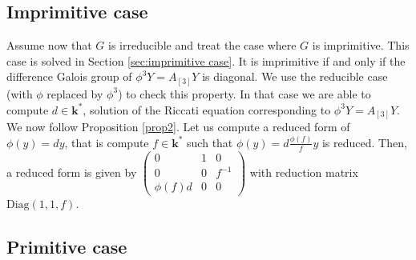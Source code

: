 \documentclass[a4paper,11pt]{amsart}
\def\k{\mathbf{k}}
\begin{document}
\subsection{Imprimitive case}
Assume now that $G$ is irreducible and treat the case where $G$ is imprimitive. This case is  solved in Section \ref{sec:imprimitive case}.
 It is imprimitive if and only if the difference Galois group of $\phi^3 Y=A_{[3]}Y$ is diagonal. We use the reducible case (with $\phi$ replaced by $\phi^3$) to check this property.   In that case we are able to compute $d\in \k^*$,  solution of the Riccati equation corresponding to $\phi^3 Y=A_{[3]}Y$.  We now follow Proposition \ref{prop2}. 
Let us   compute a reduced form of $\phi(y)=dy$, that is compute $f\in \k^*$ such that $\phi(y)=d\frac{\phi(f)}{f}y$ is reduced.  Then, a reduced form is given by 
$\left( \begin{array}{ccc}
0&1&0\\
0 &0&  f^{-1}\\
\phi(f)d & 0&0
\end{array}\right) $ with reduction matrix $\mathrm{Diag}(1,1,f)$.  



 
\subsection{Primitive case}
\end{document}
